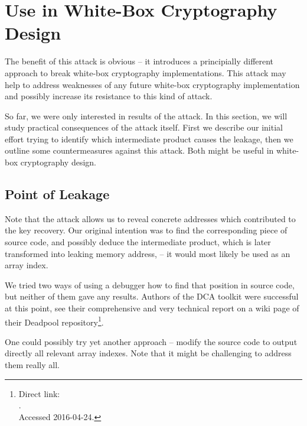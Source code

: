 \section{Use in White-Box Cryptography Design}
\label{sec:useindesign}

The benefit of this attack is obvious -- it introduces a principially different approach to break white-box cryptography implementations. This attack may help to address weaknesses of any future white-box cryptography implementation and possibly increase its resistance to this kind of attack.

So far, we were only interested in results of the attack. In this section, we will study practical consequences of the attack itself. First we describe our initial effort trying to identify which intermediate product causes the leakage, then we outline some countermeasures against this attack. Both might be useful in white-box cryptography design.



\subsection{Point of Leakage}
\label{sec:leakpoint}

Note that the attack allows us to reveal concrete addresses which contributed to the key recovery. Our original intention was to find the corresponding piece of source code, and possibly deduce the intermediate product, which is later transformed into leaking memory address, -- it would most likely be used as an array index.

We tried two ways of using a debugger how to find that position in source code, but neither of them gave any results. Authors of the DCA toolkit \cite{bos2016tools} were successful at this point, see their comprehensive and very technical report on a wiki page of their Deadpool repository\footnote{Direct link:\\.\\Accessed 2016-04-24.}.

One could possibly try yet another approach -- modify the source code to output directly all relevant array indexes. Note that it might be challenging to address them really all.


